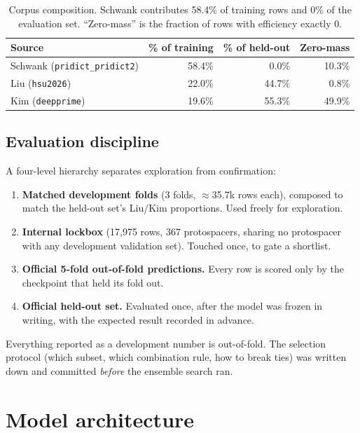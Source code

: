 \documentclass[11pt]{article}
\begin{document}
\begin{table}[H]
\centering
\caption{Corpus composition. Schwank contributes 58.4\% of training rows and 0\% of the
evaluation set. ``Zero-mass'' is the fraction of rows with efficiency exactly $0$.}
\label{tab:corpus}
\begin{tabular}{lrrr}
\toprule
Source & \% of training & \% of held-out & Zero-mass \\
\midrule
Schwank (\texttt{pridict\_pridict2}) & 58.4\% & 0.0\% & 10.3\% \\
Liu (\texttt{hsu2026}) & 22.0\% & 44.7\% & 0.8\% \\
Kim (\texttt{deepprime}) & 19.6\% & 55.3\% & 49.9\% \\
\bottomrule
\end{tabular}
\end{table}

\subsection{Evaluation discipline}

A four-level hierarchy separates exploration from confirmation:

\begin{enumerate}
\item \textbf{Matched development folds} (3 folds, $\approx$35.7k rows each), composed
to match the held-out set's Liu/Kim proportions. Used freely for exploration.
\item \textbf{Internal lockbox} (17{,}975 rows, 367 protospacers, sharing no protospacer
with any development validation set). Touched once, to gate a shortlist.
\item \textbf{Official 5-fold out-of-fold predictions.} Every row is scored only by the
checkpoint that held its fold out.
\item \textbf{Official held-out set.} Evaluated once, after the model was frozen in
writing, with the expected result recorded in advance.
\end{enumerate}

Everything reported as a development number is out-of-fold. The selection protocol
(which subset, which combination rule, how to break ties) was written down and
committed \emph{before} the ensemble search ran.

\section{Model architecture}
\end{document}
